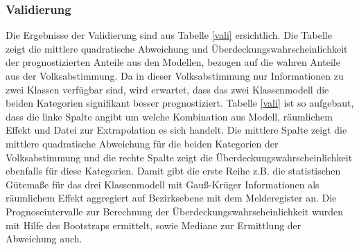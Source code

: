 \documentclass{Vorlage}
\begin{document}
\subsubsection{Validierung}
Die Ergebnisse der Validierung sind aus Tabelle \ref{vali} ersichtlich. Die Tabelle zeigt die mittlere quadratische Abweichung und Überdeckungswahrscheinlichkeit der prognostizierten Anteile aus den Modellen, bezogen auf die wahren Anteile aus der Volksabstimmung. Da in dieser Volksabstimmung nur Informationen zu zwei Klassen verfügbar sind, wird erwartet, dass das zwei Klassenmodell die beiden Kategorien signifikant besser prognostiziert.
Tabelle \ref{vali} ist so aufgebaut, dass die linke Spalte angibt um welche Kombination aus Modell, räumlichem Effekt und Datei zur Extrapolation es sich handelt. Die mittlere Spalte zeigt die mittlere quadratische Abweichung für die beiden Kategorien der Volksabstimmung und die rechte Spalte zeigt die Überdeckungswahrscheinlichkeit ebenfalls für diese Kategorien. Damit gibt die erste Reihe z.B. die statistischen Gütemaße für das drei Klassenmodell mit Gauß-Krüger Informationen als räumlichem Effekt aggregiert auf Bezirksebene mit dem Melderegister an. Die Prognoseintervalle zur Berechnung der Überdeckungswahrscheinlichkeit wurden mit Hilfe des Bootstraps ermittelt, sowie Mediane zur Ermittlung der Abweichung auch.
\end{document}
